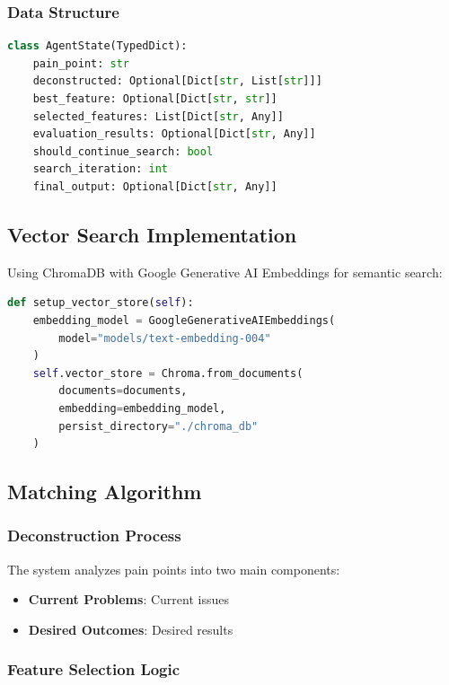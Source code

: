 \documentclass[12pt,a4paper]{article}
\begin{document}
\subsubsection{Data Structure}

\begin{lstlisting}[language=Python, caption=AgentState Structure]
class AgentState(TypedDict):
    pain_point: str
    deconstructed: Optional[Dict[str, List[str]]]
    best_feature: Optional[Dict[str, str]]
    selected_features: List[Dict[str, Any]]
    evaluation_results: Optional[Dict[str, Any]]
    should_continue_search: bool
    search_iteration: int
    final_output: Optional[Dict[str, Any]]
\end{lstlisting}

\subsection{Vector Search Implementation}

Using ChromaDB with Google Generative AI Embeddings for semantic search:

\begin{lstlisting}[language=Python, caption=Vector Store Setup]
def setup_vector_store(self):
    embedding_model = GoogleGenerativeAIEmbeddings(
        model="models/text-embedding-004"
    )
    self.vector_store = Chroma.from_documents(
        documents=documents,
        embedding=embedding_model,
        persist_directory="./chroma_db"
    )
\end{lstlisting}

\subsection{Matching Algorithm}

\subsubsection{Deconstruction Process}

The system analyzes pain points into two main components:

\begin{itemize}
    \item \textbf{Current Problems}: Current issues
    \item \textbf{Desired Outcomes}: Desired results
\end{itemize}

\subsubsection{Feature Selection Logic}
\end{document}
